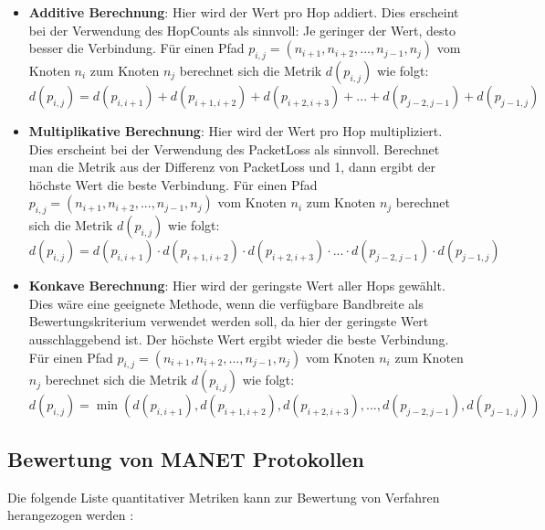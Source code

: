 \begin{itemize}
\item \textbf{Additive Berechnung}: Hier wird der Wert pro Hop addiert. Dies erscheint \zB bei der Verwendung des HopCounts als sinnvoll: Je geringer der Wert, desto besser die Verbindung. Für einen Pfad $p_{i,j}=(n_{i+1},n_{i+2},...,n_{j-1},n_j)$ vom Knoten $n_i$ zum Knoten $n_j$ berechnet sich die Metrik $d(p_{i,j})$ wie folgt:
\begin{displaymath}
d(p_{i,j})=d(p_{i,i+1}) + d(p_{i+1,i+2}) + d(p_{i+2,i+3}) + ... + d(p_{j-2,j-1}) + d(p_{j-1,j})
\end{displaymath}
\item \textbf{Multiplikative Berechnung}: Hier wird der Wert pro Hop multipliziert. Dies erscheint \zB bei der Verwendung des PacketLoss als sinnvoll. Berechnet man die Metrik aus der Differenz von PacketLoss und 1, dann ergibt der höchste Wert die beste Verbindung. Für einen Pfad $p_{i,j}=(n_{i+1},n_{i+2},...,n_{j-1},n_j)$ vom Knoten $n_i$ zum Knoten $n_j$ berechnet sich die Metrik $d(p_{i,j})$ wie folgt:
\begin{displaymath}
d(p_{i,j})=d(p_{i,i+1}) \cdot d(p_{i+1,i+2}) \cdot d(p_{i+2,i+3}) \cdot ... \cdot d(p_{j-2,j-1}) \cdot d(p_{j-1,j})
\end{displaymath}
\item \textbf{Konkave Berechnung}: Hier wird der geringste Wert aller Hops gewählt. Dies wäre eine geeignete Methode, wenn die verfügbare Bandbreite als Bewertungskriterium verwendet werden soll, da hier der geringste Wert ausschlaggebend ist. Der höchste Wert ergibt wieder die beste Verbindung. Für einen Pfad $p_{i,j}=(n_{i+1},n_{i+2},...,n_{j-1},n_j)$ vom Knoten $n_i$ zum Knoten $n_j$ berechnet sich die Metrik $d(p_{i,j})$ wie folgt:
\begin{displaymath}
d(p_{i,j})= \min{(d(p_{i,i+1}),d(p_{i+1,i+2}),d(p_{i+2,i+3}),...,d(p_{j-2,j-1}),d(p_{j-1,j}))}
\end{displaymath}
\end{itemize}

\subsection{Bewertung von MANET Protokollen}
\label{chapter:grundlagen:meshmetriken}

Die folgende Liste quantitativer Metriken kann zur Bewertung von Verfahren herangezogen werden \cite{RFC2501}:

